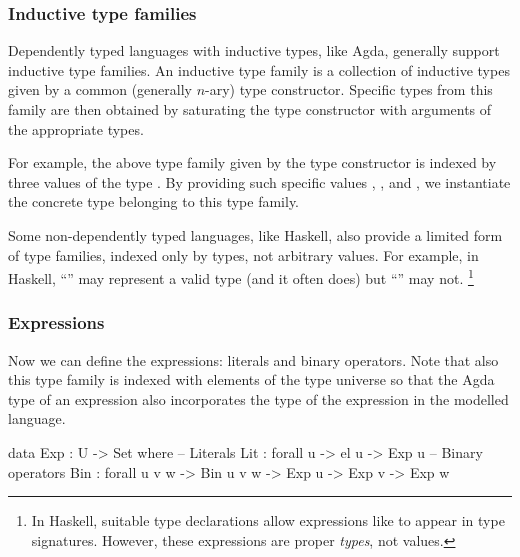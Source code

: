\subsubsection{Inductive type families}

Dependently typed languages with inductive types, like Agda, generally support inductive
type families. An inductive type family is a collection of inductive types given by
a common (generally $n$-ary) type constructor. Specific types from this family are then obtained
by saturating the type constructor with arguments of the appropriate types.

For example, the above type family given by the type constructor  is indexed
by three values of the type . By providing such specific values , ,
and , we instantiate the concrete type  belonging to this type family.

Some non-dependently typed languages, like Haskell, also provide a limited form of
type families, indexed only by types, not arbitrary values. For example, in Haskell,
``'' may represent a valid type (and it often does) but
``'' may not.%
\footnote{In Haskell, suitable type declarations allow expressions like 
to appear in type signatures. However, these expressions are proper \emph{types}, not values.}

\subsubsection{Expressions}

Now we can define the expressions: literals and binary operators.
Note that also this type family is indexed with elements of the type universe
 so that the Agda type of an expression also incorporates the type of
the expression in the modelled language.

\begin{code}
  data Exp : U -> Set where
    -- Literals
    Lit : forall {u} -> el u -> Exp u
    -- Binary operators
    Bin : forall {u v w} -> Bin u v w -> Exp u -> Exp v -> Exp w
\end{code}\label{sec:simple-exp}

